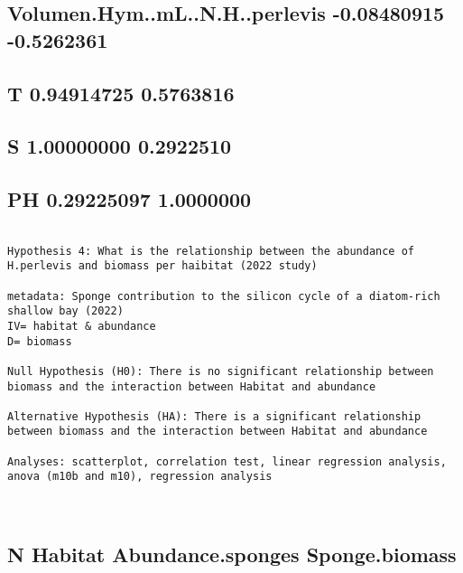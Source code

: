 \documentclass[
]{article}
\begin{document}
\hypertarget{volumen.hym..ml..n.h..perlevis--0.08480915--0.5262361}{%
\subsection{Volumen.Hym..mL..N.H..perlevis -0.08480915
-0.5262361}\label{volumen.hym..ml..n.h..perlevis--0.08480915--0.5262361}}

\hypertarget{t-0.94914725-0.5763816}{%
\subsection{T 0.94914725 0.5763816}\label{t-0.94914725-0.5763816}}

\hypertarget{s-1.00000000-0.2922510}{%
\subsection{S 1.00000000 0.2922510}\label{s-1.00000000-0.2922510}}

\hypertarget{ph-0.29225097-1.0000000}{%
\subsection{PH 0.29225097 1.0000000}\label{ph-0.29225097-1.0000000}}

\begin{verbatim}

Hypothesis 4: What is the relationship between the abundance of H.perlevis and biomass per haibitat (2022 study)

metadata: Sponge contribution to the silicon cycle of a diatom-rich shallow bay (2022) 
IV= habitat & abundance 
D= biomass

Null Hypothesis (H0): There is no significant relationship between biomass and the interaction between Habitat and abundance

Alternative Hypothesis (HA): There is a significant relationship between biomass and the interaction between Habitat and abundance

Analyses: scatterplot, correlation test, linear regression analysis, anova (m10b and m10), regression analysis



\end{verbatim}

\hypertarget{n-habitat-abundance.sponges-sponge.biomass}{%
\subsection{N Habitat Abundance.sponges
Sponge.biomass}\label{n-habitat-abundance.sponges-sponge.biomass}}
\end{document}
